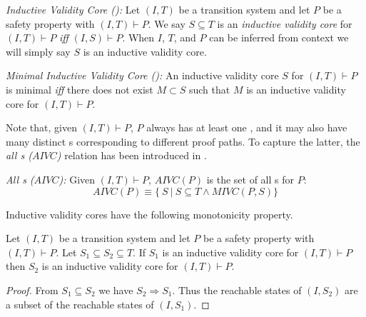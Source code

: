 \begin{definition}{\emph{Inductive Validity Core (\ivc):}}
  \label{def:ivc}
  Let $(I, T)$ be a transition system and let $P$ be a
  safety property with $(I, T)\vdash P$. We say $S \subseteq
  T$ is an {\em inductive validity core} for $(I, T)\vdash P$ \emph{iff} $(I,
  S) \vdash P$. When $I$, $T$, and $P$ can be inferred from
  context we will simply say $S$ is an inductive validity core.
\end{definition}

\begin{definition}{\emph{Minimal Inductive Validity Core (\mivc):}}
  \label{def:minimal-ivc}
  An inductive validity core $S$ for $(I, T)\vdash P$ is minimal \emph{iff}
  there does not exist $M \subset S$ such that $M$ is an inductive validity core
  for $(I, T)\vdash P$.
\end{definition}

Note that, given $(I, T) \vdash P$, $P$ always has at least one \mivc, and it may also have many distinct \mivc s corresponding to different proof paths. To capture the latter, the \emph{all \mivc s ($AIVC$)} relation has been introduced in \cite{Murugesan16:renext}.
\begin{definition}{\emph{All \mivc s ($AIVC$):}}
    \label{def:allivcs}
    Given $(I, T) \vdash P$, $AIVC(P)$ is the set of all \mivc s for $P$:
    $$ AIVC(P) \equiv  \{\ S~|~S \subseteq T \land  MIVC(P, S)\} $$
\end{definition}

Inductive validity cores have the following monotonicity property.

\begin{lemma}
  \label{lem:ivc-monotonic}
  Let $(I, T)$ be a transition system and let $P$ be a safety property
  with $(I, T)\vdash P$. Let $S_1 \subseteq S_2 \subseteq T$. If $S_1$
  is an inductive validity core for $(I, T)\vdash P$ then $S_2$ is an
  inductive validity core for $(I, T)\vdash P$.
\end{lemma}
\begin{proof}
  From $S_1 \subseteq S_2$ we have $S_2 \Rightarrow S_1$. Thus the
  reachable states of $(I, S_2)$ are a subset of the reachable states
  of $(I, S_1)$.
\end{proof}

